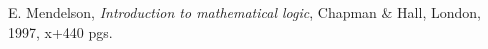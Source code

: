 \documentclass[oneside,final,11pt]{amsbook}
\theoremstyle{remark}\newtheorem{exercise}{Exercício}[chapter]
\theoremstyle{remark}\newtheorem{*exercise}[exercise]{\hbox to 0pt{\hskip 0pt minus 1fil*}Exercício}
\theoremstyle{definition}\newtheorem{exdefin}{Definição}[chapter]
\theoremstyle{plain}\newtheorem{teo}{Teorema}[section]
\theoremstyle{plain}\newtheorem{lem}[teo]{Lema}
\theoremstyle{plain}\newtheorem{prop}[teo]{Proposição}
\theoremstyle{plain}\newtheorem{cor}[teo]{Corolário}
\theoremstyle{definition}\newtheorem{defin}[teo]{Definição}
\theoremstyle{remark}\newtheorem{rem}[teo]{Observação}
\theoremstyle{definition}\newtheorem{notation}[teo]{Notação}
\theoremstyle{definition}\newtheorem{convention}[teo]{Convenção}
\theoremstyle{definition}\newtheorem{example}[teo]{Exemplo}
\numberwithin{section}{chapter}
\numberwithin{equation}{section}
\begin{document}
\backmatter



\begin{thebibliography}{99}

 E. Mendelson, {\em Introduction to mathematical logic}, Chapman \& Hall, London, 1997, x+440 pgs.

\end{thebibliography}

\iflatexml
\printindex
\else
\printindex[simbolos]
\printindex[indice]
\fi

\end{document}
